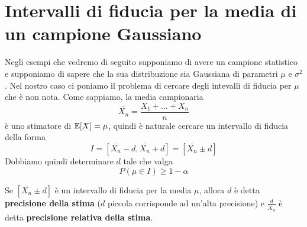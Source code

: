 \section{Intervalli di fiducia per la media di un campione Gaussiano}
Negli esempi che vedremo di seguito supponiamo di avere un campione statistico e supponiamo di
sapere che la sua distribuzione sia Gaussiana di parametri $\mu$ e $\sigma^2$. Nel nostro caso ci
poniamo il problema di cercare degli intevalli di fiducia per $\mu$ che è non nota. Come sappiamo,
la media campionaria
\[ \overline{X_n} = \frac{X_1 + \dots + X_n}{n} \]
è uno stimatore di $\mathbb{E}[X] = \mu$, quindi è naturale cercare un intervallo di fiducia della forma
\[ I = [\overline{X_n} - d, \overline{X_n} + d] = [\overline{X_n} \pm d] \]
Dobbiamo quindi determinare $d$ tale che valga
\[ P(\mu \in I) \geq 1 - \alpha \]

\begin{definition}
	Se $[\overline{X_n} \pm d]$ è un intervallo di fiducia per la media $\mu$, allora $d$ è detta
	\textbf{precisione della stima} ($d$ piccola corrisponde ad un'alta precisione) e
	$\frac{d}{\overline{X_n}}$ è detta \textbf{precisione relativa della stima}.
\end{definition}

